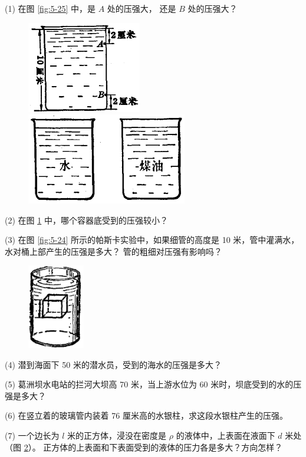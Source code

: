 (1) 在图 \ref{fig:5-25} 中，是 $A$ 处的压强大， 还是 $B$ 处的压强大？

\begin{figure}[htbp]
    \centering
    \begin{minipage}{5cm}
    \centering
    \includegraphics[width=5cm]{../pic/czwl1-ch5-25}
    \caption{}\label{fig:5-25}
    \end{minipage}
    \qquad
    \begin{minipage}{9cm}
    \centering
    \includegraphics[width=7cm]{../pic/czwl1-ch5-26}
    \caption{}\label{fig:5-26}
    \end{minipage}
\end{figure}

(2) 在图 \ref{fig:5-26} 中，哪个容器底受到的压强较小？

(3) 在图 \ref{fig:5-24} 所示的帕斯卡实验中，如果细管的高度是 10 米，管中灌满水，水对桶上部产生的压强是多大？
管的粗细对压强有影响吗？

\begin{figure}
    \centering
    \includegraphics[width=2.5cm]{../pic/czwl1-ch5-27}
    \caption{}\label{fig:5-27}
\end{figure}

(4) 潜到海面下 50 米的潜水员，受到的海水的压强是多大？

(5) 葛洲坝水电站的拦河大坝高 70 米，当上游水位为 60 米时，坝底受到的水的压强是多大？

(6) 在竖立着的玻璃管内装着 76 厘米高的水银柱，求这段水银柱产生的压强。

(7) 一个边长为 $l$ 米的正方体，浸没在密度是 $\rho$ 的液体中，上表面在液面下 $d$ 米处（图 \ref{fig:5-27}）。
正方体的上表面和下表面受到的液体的压力各是多大？方向怎样？


